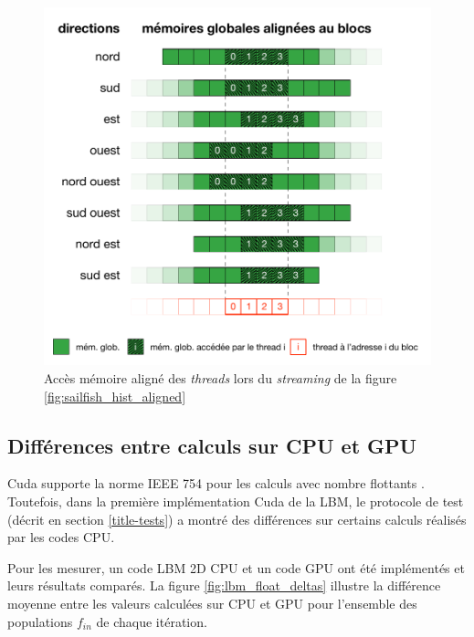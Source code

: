 \begin{figure}[h]
	\centering
	\includegraphics[fbox,scale=0.95]{images/streaming/sailfish_hist_dir_aligned.pdf}
	\caption{Accès mémoire aligné des \textit{threads} lors du \textit{streaming} de la figure \ref{fig:sailfish_hist_aligned}}
	\label{fig:sailfish_hist_dir_aligned}
\end{figure}

\subsection{Différences entre calculs sur CPU et GPU} \label{title-floats}
Cuda supporte la norme IEEE 754 pour les calculs avec nombre flottants \cite{noauthor_cuda_2017}. Toutefois, dans la première implémentation Cuda de la \acs{LBM}, le protocole de test (décrit en section \ref{title-tests}) a montré des différences sur certains calculs réalisés par les codes \ac{CPU}.

Pour les mesurer, un code \ac{LBM} 2D \ac{CPU} et un code \ac{GPU} ont été implémentés et leurs résultats comparés. La figure \ref{fig:lbm_float_deltas} illustre la différence moyenne entre les valeurs calculées sur \ac{CPU} et \ac{GPU} pour l'ensemble des populations $f_{in}$ de chaque itération.

